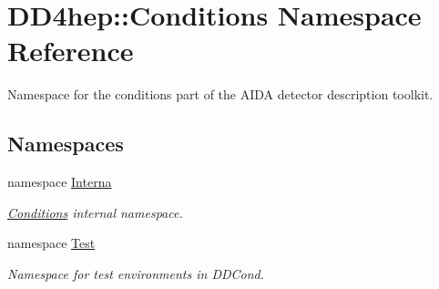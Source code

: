 \hypertarget{namespace_d_d4hep_1_1_conditions}{
\section{DD4hep::Conditions Namespace Reference}
\label{namespace_d_d4hep_1_1_conditions}
}


Namespace for the conditions part of the AIDA detector description toolkit.  
\subsection*{Namespaces}
\begin{DoxyCompactItemize}
\item 
namespace \hyperlink{namespace_d_d4hep_1_1_conditions_1_1_interna}{Interna}


\begin{DoxyCompactList}\small\item\em \hyperlink{namespace_d_d4hep_1_1_conditions}{Conditions} internal namespace. \item\end{DoxyCompactList}\item 
namespace \hyperlink{namespace_d_d4hep_1_1_conditions_1_1_test}{Test}


\begin{DoxyCompactList}\small\item\em Namespace for test environments in DDCond. \item\end{DoxyCompactList}\end{DoxyCompactItemize}
